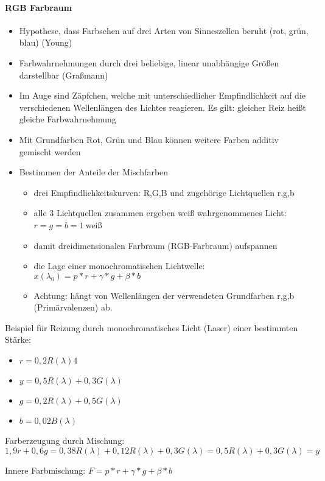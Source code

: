 \documentclass[10pt,landscape]{article}
\begin{document}
\begin{multicols}{3}
  \paragraph{RGB Farbraum}
  \begin{itemize}
    \item Hypothese, dass Farbsehen auf drei Arten von Sinneszellen beruht (rot, grün, blau) (Young)
    \item Farbwahrnehmungen durch drei beliebige, linear unabhängige Größen darstellbar (Graßmann)
    \item Im Auge sind Zäpfchen, welche mit unterschiedlicher Empfindlichkeit auf die verschiedenen Wellenlängen des Lichtes reagieren. Es gilt: gleicher Reiz heißt gleiche Farbwahrnehmung
    \item Mit Grundfarben Rot, Grün und Blau können weitere Farben additiv gemischt werden
    \item Bestimmen der Anteile der Mischfarben
          \begin{itemize}
            \item drei Empfindlichkeitskurven: R,G,B und zugehörige Lichtquellen r,g,b
            \item alle 3 Lichtquellen zusammen ergeben weiß wahrgenommenes Licht: $r=g=b=1~$weiß
            \item damit dreidimensionalen Farbraum (RGB-Farbraum) aufspannen
            \item die Lage einer monochromatischen Lichtwelle: $x(\lambda_0)=p*r+\gamma*g+\beta*b$
            \item Achtung: hängt von Wellenlängen der verwendeten Grundfarben r,g,b (Primärvalenzen) ab.
          \end{itemize}
  \end{itemize}
  
  Beispiel für Reizung durch monochromatisches Licht (Laser) einer bestimmten Stärke:
  \begin{itemize}
    \item $r=0,2R(\lambda)4$
    \item $y=0,5R(\lambda)+0,3G(\lambda)$
    \item $g=0,2R(\lambda)+0,5G(\lambda)$
    \item $b=0,02B(\lambda)$
  \end{itemize}
  
  Farberzeugung durch Mischung:
  $$1,9r + 0,6g = 0,38R(\lambda)+0,12R(\lambda)+0,3G(\lambda)=0,5R(\lambda)+0,3G(\lambda) = y$$
  
  
  Innere Farbmischung: $F=p*r + \gamma*g + \beta*b$
  

\end{multicols}
\end{document}
